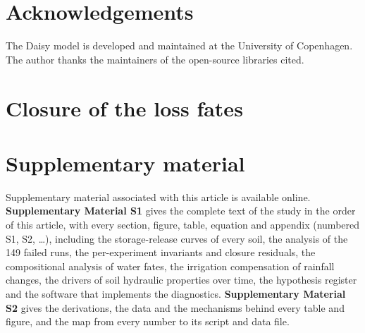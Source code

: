 \documentclass[review,12pt,authoryear]{elsarticle}
\begin{document}
\section*{Acknowledgements}
The Daisy model is developed and maintained at the University of Copenhagen. The author thanks the maintainers of the open-source libraries cited.

\appendix
\section{Closure of the loss fates}

\section*{Supplementary material}
Supplementary material associated with this article is available online. \textbf{Supplementary Material S1} gives the complete text of the study in the order of this article, with every section, figure, table, equation and appendix (numbered S1, S2, \ldots), including the storage-release curves of every soil, the analysis of the 149 failed runs, the per-experiment invariants and closure residuals, the compositional analysis of water fates, the irrigation compensation of rainfall changes, the drivers of soil hydraulic properties over time, the hypothesis register and the software that implements the diagnostics. \textbf{Supplementary Material S2} gives the derivations, the data and the mechanisms behind every table and figure, and the map from every number to its script and data file.



\end{document}
